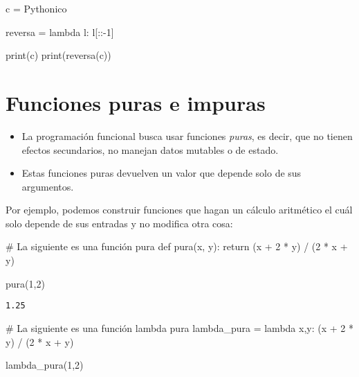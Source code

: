 \documentclass[
  letterpaper,
  DIV=11,
  numbers=noendperiod]{scrreprt}
\newenvironment{Shaded}{\begin{snugshade}}{\end{snugshade}}
\newcommand{\BuiltInTok}[1]{\textcolor[rgb]{0.00,0.23,0.31}{#1}}
\newcommand{\CommentTok}[1]{\textcolor[rgb]{0.37,0.37,0.37}{#1}}
\newcommand{\ControlFlowTok}[1]{\textcolor[rgb]{0.00,0.23,0.31}{#1}}
\newcommand{\DecValTok}[1]{\textcolor[rgb]{0.68,0.00,0.00}{#1}}
\newcommand{\KeywordTok}[1]{\textcolor[rgb]{0.00,0.23,0.31}{#1}}
\newcommand{\NormalTok}[1]{\textcolor[rgb]{0.00,0.23,0.31}{#1}}
\newcommand{\OperatorTok}[1]{\textcolor[rgb]{0.37,0.37,0.37}{#1}}
\newcommand{\StringTok}[1]{\textcolor[rgb]{0.13,0.47,0.30}{#1}}
\begin{document}
\begin{Shaded}
\begin{Highlighting}[]
\NormalTok{c }\OperatorTok{=} \StringTok{\textquotesingle{}Pythonico\textquotesingle{}}

\NormalTok{reversa }\OperatorTok{=} \KeywordTok{lambda}\NormalTok{ l: l[::}\OperatorTok{{-}}\DecValTok{1}\NormalTok{]}

\BuiltInTok{print}\NormalTok{(c)}
\BuiltInTok{print}\NormalTok{(reversa(c))}
\end{Highlighting}
\end{Shaded}


\chapter{Funciones puras e impuras}\label{funciones-puras-e-impuras}

\begin{itemize}
\item
  La programación funcional busca usar funciones \emph{puras}, es decir,
  que no tienen efectos secundarios, no manejan datos mutables o de
  estado.
\item
  Estas funciones puras devuelven un valor que depende solo de sus
  argumentos.
\end{itemize}

Por ejemplo, podemos construir funciones que hagan un cálculo aritmético
el cuál solo depende de sus entradas y no modifica otra cosa:

\begin{Shaded}
\begin{Highlighting}[]
\CommentTok{\# La siguiente es una función pura}
\KeywordTok{def}\NormalTok{ pura(x, y):}
    \ControlFlowTok{return}\NormalTok{ (x }\OperatorTok{+} \DecValTok{2} \OperatorTok{*}\NormalTok{ y) }\OperatorTok{/}\NormalTok{ (}\DecValTok{2} \OperatorTok{*}\NormalTok{ x }\OperatorTok{+}\NormalTok{ y)}

\NormalTok{pura(}\DecValTok{1}\NormalTok{,}\DecValTok{2}\NormalTok{)}
\end{Highlighting}
\end{Shaded}

\begin{verbatim}
1.25
\end{verbatim}

\begin{Shaded}
\begin{Highlighting}[]
\CommentTok{\# La siguiente es una función lambda pura}
\NormalTok{lambda\_pura }\OperatorTok{=} \KeywordTok{lambda}\NormalTok{ x,y: (x }\OperatorTok{+} \DecValTok{2} \OperatorTok{*}\NormalTok{ y) }\OperatorTok{/}\NormalTok{ (}\DecValTok{2} \OperatorTok{*}\NormalTok{ x }\OperatorTok{+}\NormalTok{ y)}

\NormalTok{lambda\_pura(}\DecValTok{1}\NormalTok{,}\DecValTok{2}\NormalTok{)}
\end{Highlighting}
\end{Shaded}
\end{document}
